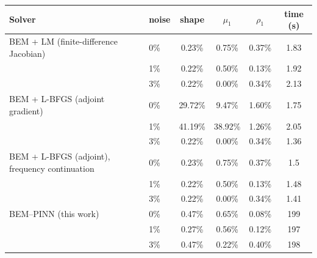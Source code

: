 \begin{tabular}{llcccc}
\toprule
Solver & noise & shape & $\mu_1$ & $\rho_1$ & time (s)\\
\midrule
BEM + LM (finite-difference Jacobian) & 0\% & 0.23\% & 0.75\% & 0.37\% & 1.83\\
 & 1\% & 0.22\% & 0.50\% & 0.13\% & 1.92\\
 & 3\% & 0.22\% & 0.00\% & 0.34\% & 2.13\\
\addlinespace
BEM + L-BFGS (adjoint gradient) & 0\% & 29.72\% & 9.47\% & 1.60\% & 1.75\\
 & 1\% & 41.19\% & 38.92\% & 1.26\% & 2.05\\
 & 3\% & 0.22\% & 0.00\% & 0.34\% & 1.36\\
\addlinespace
BEM + L-BFGS (adjoint), frequency continuation & 0\% & 0.23\% & 0.75\% & 0.37\% & 1.5\\
 & 1\% & 0.22\% & 0.50\% & 0.13\% & 1.48\\
 & 3\% & 0.22\% & 0.00\% & 0.34\% & 1.41\\
\addlinespace
BEM--PINN (this work) & 0\% & 0.47\% & 0.65\% & 0.08\% & 199\\
 & 1\% & 0.27\% & 0.56\% & 0.12\% & 197\\
 & 3\% & 0.47\% & 0.22\% & 0.40\% & 198\\
\bottomrule
\end{tabular}
